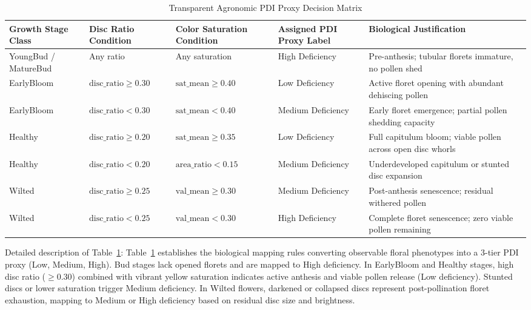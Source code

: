 \documentclass{ieeeaccess}
\begin{document}
\begin{table}[!t]
\caption{Transparent Agronomic PDI Proxy Decision Matrix}
\label{tab:pdi_decision_matrix}
\centering
\begin{tabular*}{\textwidth}{@{\extracolsep{\fill}}lllll@{}}
\toprule
\textbf{Growth Stage Class} & \textbf{Disc Ratio Condition} & \textbf{Color Saturation Condition} & \textbf{Assigned PDI Proxy Label} & \textbf{Biological Justification} \\
\midrule
YoungBud / MatureBud & Any ratio             & Any saturation         & High Deficiency   & Pre-anthesis; tubular florets immature, no pollen shed \\
EarlyBloom           & $\text{disc\_ratio} \ge 0.30$ & $\text{sat\_mean} \ge 0.40$ & Low Deficiency    & Active floret opening with abundant dehiscing pollen \\
EarlyBloom           & $\text{disc\_ratio} < 0.30$   & $\text{sat\_mean} < 0.40$   & Medium Deficiency & Early floret emergence; partial pollen shedding capacity \\
Healthy              & $\text{disc\_ratio} \ge 0.20$ & $\text{sat\_mean} \ge 0.35$ & Low Deficiency    & Full capitulum bloom; viable pollen across open disc whorls \\
Healthy              & $\text{disc\_ratio} < 0.20$   & $\text{area\_ratio} < 0.15$ & Medium Deficiency & Underdeveloped capitulum or stunted disc expansion \\
Wilted               & $\text{disc\_ratio} \ge 0.25$ & $\text{val\_mean} \ge 0.30$ & Medium Deficiency & Post-anthesis senescence; residual withered pollen \\
Wilted               & $\text{disc\_ratio} < 0.25$   & $\text{val\_mean} < 0.30$   & High Deficiency   & Complete floret senescence; zero viable pollen remaining \\
\bottomrule
\end{tabular*}
\end{table}

Detailed description of Table~\ref{tab:pdi_decision_matrix}: Table~\ref{tab:pdi_decision_matrix} establishes the biological mapping rules converting observable floral phenotypes into a 3-tier PDI proxy (Low, Medium, High). Bud stages lack opened florets and are mapped to High deficiency. In EarlyBloom and Healthy stages, high disc ratio ($\ge 0.30$) combined with vibrant yellow saturation indicates active anthesis and viable pollen release (Low deficiency). Stunted discs or lower saturation trigger Medium deficiency. In Wilted flowers, darkened or collapsed discs represent post-pollination floret exhaustion, mapping to Medium or High deficiency based on residual disc size and brightness.
\end{document}
